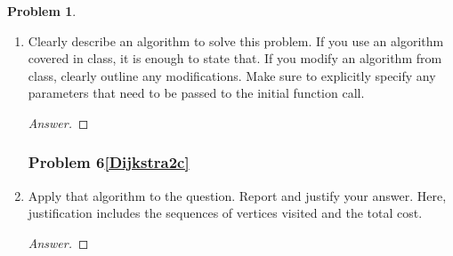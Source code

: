 \documentclass[11pt]{article}
\theoremstyle{definition}
\theoremstyle{definition}
\newtheorem{required}{Problem}
\theoremstyle{definition}
\begin{document}
\begin{required}
\begin{enumerate}[label=(\alph*)]
\begin{proof}[Answer]
\end{proof}

\newpage
\subsubsection{Problem 6\ref{Dijkstra2b}}
\item \label{Dijkstra2b} Clearly describe an algorithm to solve this problem. If you use an algorithm covered in class, it is enough to state that. If you modify an algorithm from class, clearly outline any modifications. Make sure to explicitly specify any parameters that need to be passed to the initial function call.

\begin{proof}[Answer]
\end{proof}



\newpage
\subsubsection{Problem 6\ref{Dijkstra2c}}
\item \label{Dijkstra2c} Apply that algorithm to the question. Report and justify your answer. Here, justification includes the sequences of vertices visited and the total cost. 

\begin{proof}[Answer]
\end{proof}

\end{enumerate}
\end{required}
\end{document}
